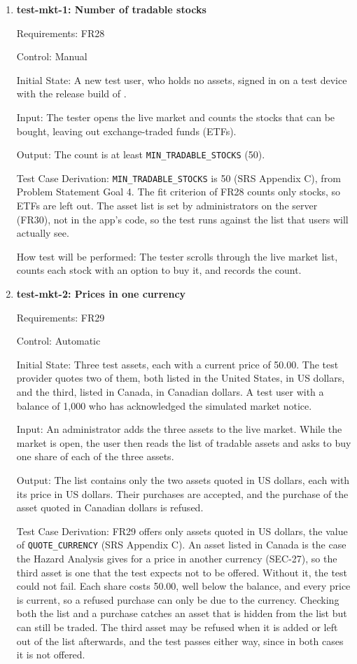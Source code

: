 \documentclass[12pt, titlepage]{article}
\begin{document}
\begin{enumerate}

\item{\textbf{test-mkt-1: Number of tradable stocks}\\}

Requirements: FR28

Control: Manual

Initial State: A new test user, who holds no assets, signed in on a test
device with the release build of \progname{}.

Input: The tester opens the live market and counts the stocks that can be
bought, leaving out exchange-traded funds (ETFs).

Output: The count is at least \texttt{MIN\_TRADABLE\_STOCKS} (50).

Test Case Derivation: \texttt{MIN\_TRADABLE\_STOCKS} is 50 (SRS Appendix C),
from Problem Statement Goal 4. The fit criterion of FR28 counts only stocks,
so ETFs are left out. The asset list is set by administrators on the server
(FR30), not in the app's code, so the test runs against the list that users
will actually see.

How test will be performed: The tester scrolls through the live market list,
counts each stock with an option to buy it, and records the count.

\item{\textbf{test-mkt-2: Prices in one currency}\\}

Requirements: FR29

Control: Automatic

Initial State: Three test assets, each with a current price of 50.00. The
test provider quotes two of them, both listed in the United States, in US
dollars, and the third, listed in Canada, in Canadian dollars. A test user
with a balance of 1,000 who has acknowledged the simulated market notice.

Input: An administrator adds the three assets to the live market. While the
market is open, the user then reads the list of tradable assets and asks to
buy one share of each of the three assets.

Output: The list contains only the two assets quoted in US dollars, each with
its price in US dollars. Their purchases are accepted, and the purchase of the
asset quoted in Canadian dollars is refused.

Test Case Derivation: FR29 offers only assets quoted in US dollars, the
value of \texttt{QUOTE\_CURRENCY} (SRS Appendix C). An asset listed in Canada
is the case the Hazard Analysis gives for a price in another currency
(SEC-27), so the third asset is one that the test expects not to be offered.
Without it, the test could not fail. Each share costs 50.00, well below the
balance, and every price is current, so a refused purchase can only be due to
the currency. Checking both the list and a purchase catches an asset that is
hidden from the list but can still be traded. The third asset may be refused
when it is added or left out of the list afterwards, and the test passes
either way, since in both cases it is not offered.


\end{enumerate}
\end{document}
